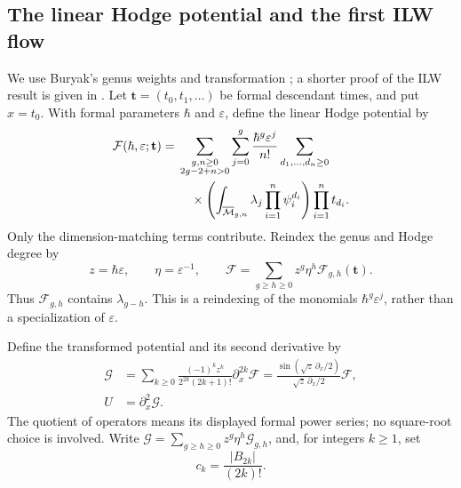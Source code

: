 \subsection{The linear Hodge potential and the first ILW flow}
\label{subsec:s07:01}

We use Buryak's genus weights and transformation
\cite[Theorem~1.1, (1.1)--(1.2)]{Bur15}; a shorter proof of the
ILW result is given in \cite[Theorem~1.1 and Section~2]{Bur16}.
Let $\mathbf t=(t_0,t_1,\ldots)$ be formal descendant times, and put
$x=t_0$. With formal parameters $\hbar$ and $\varepsilon$, define the
linear Hodge potential by
\begin{equation}\label{eq:s07:hodge-potential}
 \begin{aligned}
 \mathcal F(\hbar,\varepsilon;\mathbf t)
 ={}&\sum_{\substack{g,n\geq0\\2g-2+n>0}}
   \sum_{j=0}^g\frac{\hbar^g\varepsilon^j}{n!}
   \sum_{d_1,\ldots,d_n\geq0}\\
 &\quad\times
   \left(\int_{\overline{\mathcal{M}}_{g,n}}\lambda_j
                    \prod_{i=1}^n\psi_i^{d_i}\right)
   \prod_{i=1}^n t_{d_i}.
 \end{aligned}
\end{equation}
Only the dimension-matching terms contribute. Reindex the genus and
Hodge degree by
\begin{equation}\label{eq:s07:defect-variables}
 z=\hbar\varepsilon,\qquad \eta=\varepsilon^{-1},\qquad
 \mathcal F=\sum_{g\geq h\geq0}z^g\eta^h
                         \mathcal F_{g,h}(\mathbf t).
\end{equation}
Thus $\mathcal F_{g,h}$ contains $\lambda_{g-h}$. This is a reindexing
of the monomials $\hbar^g\varepsilon^j$, rather than a specialization
of $\varepsilon$.

Define the transformed potential and its second derivative by
\begin{equation}\label{eq:s07:miura}
 \begin{aligned}
 \mathcal G
 &=\sum_{k\geq0}\frac{(-1)^kz^k}{2^{2k}(2k+1)!}
                         \partial_x^{2k}\mathcal F
 =\frac{\sin(\sqrt z\,\partial_x/2)}{\sqrt z\,\partial_x/2}
                         \mathcal F,\\
 U&=\partial_x^2\mathcal G.
 \end{aligned}
\end{equation}
The quotient of operators means its displayed formal power series;
no square-root choice is involved. Write
$\mathcal G=\sum_{g\geq h\geq0}z^g\eta^h\mathcal G_{g,h}$, and, for
integers $k\geq1$, set
\begin{equation}\label{eq:s07:ilw-coefficients}
 c_k=\frac{|B_{2k}|}{(2k)!}.
\end{equation}

